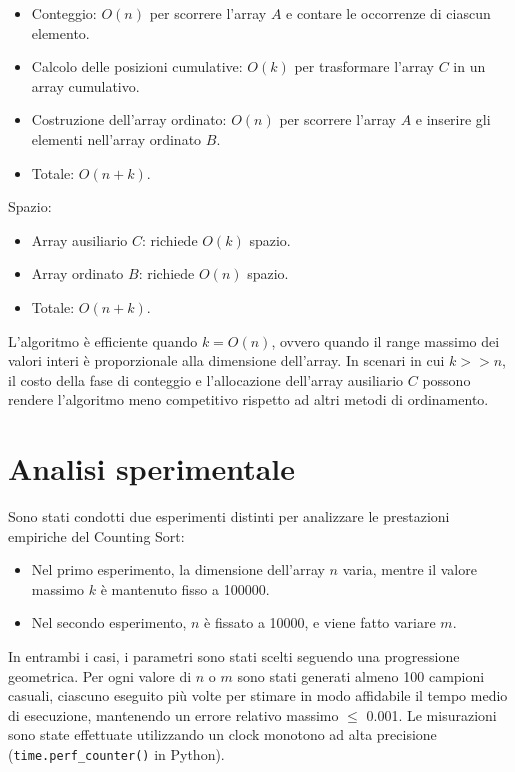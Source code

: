 \documentclass[a4paper, 12pt, oneside]{book}
\begin{document}
\begin{itemize}
    \item Conteggio: \(O(n)\) per scorrere l'array \(A\) e contare le occorrenze di ciascun elemento.
    \item Calcolo delle posizioni cumulative: \(O(k)\) per trasformare l'array \(C\) in un array cumulativo.
    \item Costruzione dell'array ordinato: \(O(n)\) per scorrere l'array \(A\) e inserire gli elementi nell'array ordinato \(B\).
    \item Totale: \(O(n + k)\).
\end{itemize}

\noindent Spazio:

\begin{itemize}
    \item Array ausiliario \(C\): richiede \(O(k)\) spazio.
    \item Array ordinato \(B\): richiede \(O(n)\) spazio.
    \item Totale: \(O(n + k)\).
\end{itemize}

\noindent L'algoritmo è efficiente quando \(k = O(n)\), ovvero quando il range massimo dei valori interi è proporzionale alla dimensione dell'array.
In scenari in cui \(k >> n\), il costo della fase di conteggio e l'allocazione dell'array ausiliario \(C\) possono rendere l'algoritmo meno competitivo rispetto ad altri metodi di ordinamento.

\section{Analisi sperimentale}

Sono stati condotti due esperimenti distinti per analizzare le prestazioni empiriche del Counting Sort:

\begin{itemize}
    \item Nel primo esperimento, la dimensione dell'array \(n\) varia, mentre il valore massimo \(k\) è mantenuto fisso a 100000.
    \item Nel secondo esperimento, \(n\) è fissato a 10000, e viene fatto variare \(m\).
\end{itemize}

\noindent In entrambi i casi, i parametri sono stati scelti seguendo una progressione geometrica.
Per ogni valore di \(n\) o \(m\) sono stati generati almeno 100 campioni casuali, ciascuno eseguito più volte per stimare in modo affidabile il tempo medio di esecuzione, mantenendo un errore relativo massimo \(\leq\) 0.001.
Le misurazioni sono state effettuate utilizzando un clock monotono ad alta precisione (\texttt{time.perf\_counter()} in Python). \\
\end{document}
